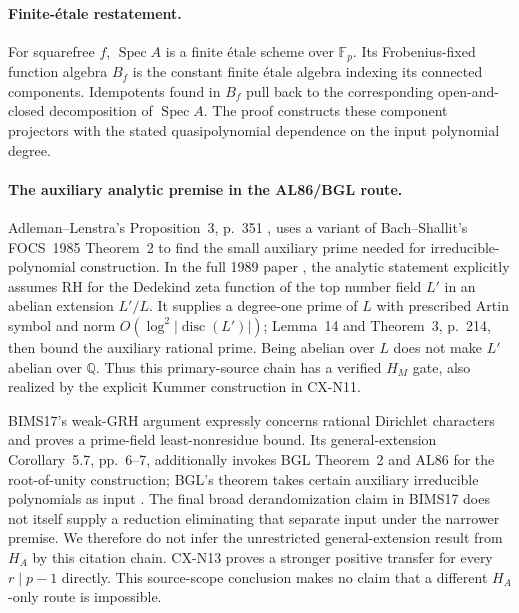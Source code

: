 \documentclass[11pt,a4paper]{article}
\begin{document}
\paragraph{Finite-\'etale restatement.}
For squarefree \(f\), \(\operatorname{Spec}A\) is a finite
\'etale scheme over \(\mathbb F_p\).
Its Frobenius-fixed function algebra \(B_f\) is the constant
finite \'etale algebra indexing its connected components.
Idempotents found in \(B_f\) pull back to the corresponding
open-and-closed decomposition of \(\operatorname{Spec}A\).
The proof constructs these component projectors with the stated
quasipolynomial dependence on the input polynomial degree.


\paragraph{The auxiliary analytic premise in the AL86/BGL route.}
Adleman--Lenstra's Proposition~3, p.~351 \cite{CXNAdlemanLenstra86},
uses a variant of Bach--Shallit's FOCS~1985 Theorem~2 to find the
small auxiliary prime needed for irreducible-polynomial construction.
In the full 1989 paper \cite[\S8, Lemma~13, pp.~213--214]{CXBachShallit89},
the analytic statement explicitly assumes RH for the Dedekind zeta
function of the top number field $L'$ in an abelian extension
$L'/L$. It supplies a degree-one prime of $L$ with prescribed Artin
symbol and norm $O(\log^2|\operatorname{disc}(L')|)$; Lemma~14 and
Theorem~3, p.~214, then bound the auxiliary rational prime.
Being abelian over $L$ does not make $L'$ abelian over $\mathbb Q$.
Thus this primary-source chain has a verified $H_M$ gate, also
realized by the explicit Kummer construction in CX-N11.

BIMS17's \cite[Conjecture~6.3 and Theorem~6.7, pp.~7--8]{BIMS17}
weak-GRH argument expressly concerns rational Dirichlet characters
and proves a prime-field least-nonresidue bound. Its general-extension
Corollary~5.7, pp.~6--7, additionally invokes BGL Theorem~2 and AL86
for the root-of-unity construction; BGL's theorem takes certain
auxiliary irreducible polynomials as input
\cite[Theorem~2, p.~7]{CXNBGL01}.
The final broad derandomization claim in BIMS17 does not itself
supply a reduction eliminating that separate input under the narrower
premise. We therefore do not infer the unrestricted general-extension
result from $H_A$ by this citation chain. CX-N13 proves a stronger
positive transfer for every $r\mid p-1$ directly. This source-scope
conclusion makes no claim that a different $H_A$-only route is
impossible.
\end{document}

